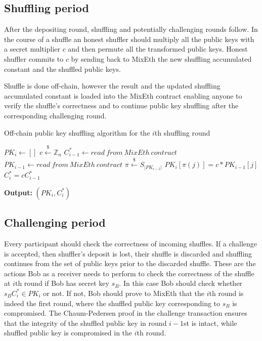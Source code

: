\documentclass[conference, compsoc]{IEEEtran}
\theoremstyle{definition}
\begin{document}
\subsection{Shuffling period}
After the depositing round, shuffling and potentially challenging rounds follow. In the course of a shuffle an honest shuffler should multiply all the public keys with a secret multiplier $c$ and then permute all the transformed public keys. Honest shuffler commits to $c$ by sending back to MixEth the new shuffling accumulated constant and the shuffled public keys.

Shuffle is done off-chain, however the result and the updated shuffling accumulated constant is loaded into the MixEth contract enabling anyone to verify the shuffle's correctness and to continue public key shuffling after the corresponding challenging round.

\begin{algorithm}
	\caption{Off-chain public key shuffling algorithm for the $i$th shuffling round}\label{shufflingoffchain}
	\begin{algorithmic}[1]
		\State $PK_{i} \gets []$
		\State $c\stackrel{\$}{\leftarrow}\mathbb{Z}_n$
		\State $C^{*}_{i-1}\leftarrow read\ from\ MixEth\ contract$
		\State $PK_{i-1}\leftarrow read\ from\ MixEth\ contract$
		\State $\pi\stackrel{\$}{\leftarrow}S_{|PK_{i-1}|}$ 
		\State $PK_{i}[\pi(j)]=c*PK_{i-1}[j]$ 
		\EndFor
		\State $C^{*}_{i}=cC^{*}_{i-1}$
		
		\hspace*{\algorithmicindent} \textbf{Output:} $(PK_{i},C^{*}_{i})$ 
	\end{algorithmic}   
\end{algorithm}
\subsection{Challenging period}
Every participant should check the correctness of incoming shuffles. If a challenge is accepted, then shuffler's deposit is lost, their shuffle is discarded and shuffling continues from the set of public keys prior to the discarded shuffle. These are the actions Bob as a receiver needs to perform to check the correctness of the shuffle at $i$th round if Bob has secret key $s_{B}$. In this case Bob should check whether $s_{B}C^{*}_{i} \in PK_{i}$ or not. If not, Bob should prove to MixEth that the $i$th round is indeed the first round, where the shuffled public key corresponding to $s_{B}$ is compromised. The Chaum-Pedersen proof in the challenge transaction ensures that the integrity of the shuffled public key in round $i-1$st is intact, while shuffled public key is compromised in the $i$th round.   
\end{document}
